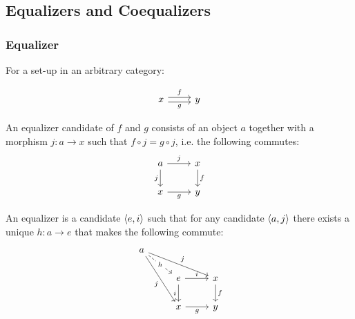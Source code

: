 \subsection{Equalizers and Coequalizers}

\subsubsection*{Equalizer}

\begin{definition}
  For a set-up in an arbitrary category:
  \parencite{leinster:basic_category_theory}

  \[\begin{tikzcd}[ampersand replacement=\&]
    x \& y
    \arrow["f", shift left=1, from=1-1, to=1-2]
    \arrow["g"', shift right=1, from=1-1, to=1-2]
  \end{tikzcd}\]

  An equalizer candidate of $f$ and $g$ consists of an object $a$ together with
  a morphism $j:a\to x$ such that $f\circ j = g\circ j$, i.e. the following commutes:
  \[\begin{tikzcd}[ampersand replacement=\&]
    a \& x \\
    x \& y
    \arrow["f", from=1-2, to=2-2]
    \arrow["g"', from=2-1, to=2-2]
    \arrow["j"', from=1-1, to=2-1]
    \arrow["j", from=1-1, to=1-2]
  \end{tikzcd}\]

  An equalizer is a candidate $\langle e, i\rangle$ such that for any candidate $\langle a, j\rangle$
  there exists a unique $h:a\to e$ that makes the following commute:
  \[\begin{tikzcd}[ampersand replacement=\&]
    a \\
    \& e \& x \\
    \& x \& y
    \arrow["i"', from=2-2, to=3-2]
    \arrow["i", from=2-2, to=2-3]
    \arrow["f", from=2-3, to=3-3]
    \arrow["g"', from=3-2, to=3-3]
    \arrow["j"', from=1-1, to=3-2]
    \arrow["j", from=1-1, to=2-3]
    \arrow["h"{description}, dashed, from=1-1, to=2-2]
  \end{tikzcd}\]
\end{definition}

